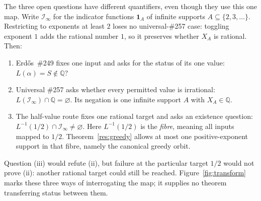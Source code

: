 \documentclass[11pt]{article}
\theoremstyle{definition}
\theoremstyle{remark}
\newcommand{\Q}{\mathbb{Q}}
\begin{document}
The three open questions have different quantifiers, even though they use
this one map.  Write \(\mathcal I_\infty\) for the indicator functions
\(\mathbf 1_A\) of infinite supports \(A\subseteq\{2,3,\ldots\}\).
Restricting to exponents at least \(2\) loses no universal-\#257 case:
toggling exponent \(1\) adds the rational number \(1\), so it preserves
whether \(X_A\) is rational.  Then:
\begin{enumerate}[label=\textup{(\roman*)},leftmargin=2.2em]
\item Erd\H{o}s~\#249 fixes one input and asks for the status of its one
value: \(L(\alpha)=S\notin\Q\)?
\item Universal \#257 asks whether every permitted value is irrational:
\(L(\mathcal I_\infty)\cap\Q=\varnothing\).  Its negation is one infinite
support $A$ with $X_A\in\Q$.
\item The half-value route fixes one rational target and asks an existence
question:
\(L^{-1}(1/2)\cap\mathcal I_\infty\ne\varnothing\).  Here
\(L^{-1}(1/2)\) is the \emph{fibre}, meaning all inputs mapped to $1/2$.
Theorem~\ref{res:greedy} allows at most one positive-exponent support in that
fibre, namely the canonical greedy orbit.
\end{enumerate}
Question (iii) would refute (ii), but failure at the particular target
$1/2$ would not prove (ii): another rational target could still be reached.
Figure~\ref{fig:transform} marks these three ways of interrogating the map;
it supplies no theorem transferring status between them.
\end{document}
